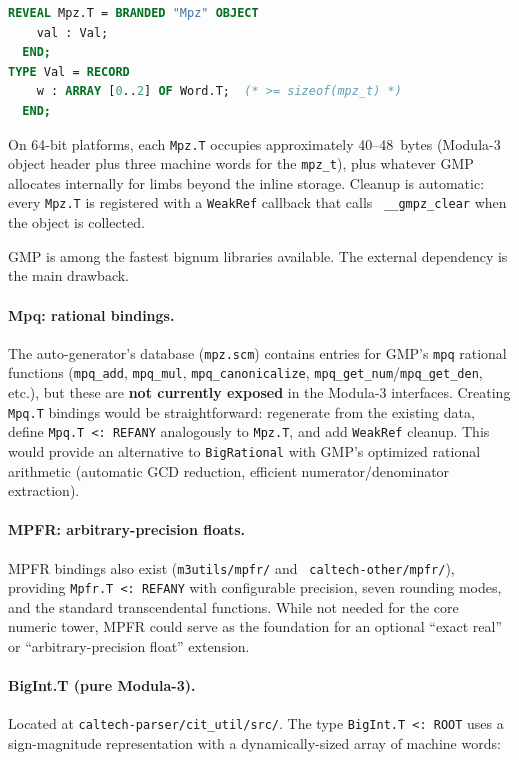 \documentclass[12pt]{report}
\begin{document}
\begin{lstlisting}[language=Modula3]
REVEAL Mpz.T = BRANDED "Mpz" OBJECT
    val : Val;
  END;
TYPE Val = RECORD
    w : ARRAY [0..2] OF Word.T;  (* >= sizeof(mpz_t) *)
  END;
\end{lstlisting}

\noindent On 64-bit platforms, each {\tt Mpz.T} occupies approximately
40--48~bytes (Modula-3 object header plus three machine words for the
{\tt mpz\_t}), plus whatever GMP allocates internally for limbs beyond
the inline storage.  Cleanup is automatic: every {\tt Mpz.T} is
registered with a {\tt WeakRef} callback that calls {\tt
\_\_gmpz\_clear} when the object is collected.

GMP is among the fastest bignum libraries available.
The external dependency is the main drawback.

\paragraph{Mpq: rational bindings.}
The auto-generator's database ({\tt mpz.scm}) contains entries for
GMP's {\tt mpq} rational functions ({\tt mpq\_add}, {\tt mpq\_mul},
{\tt mpq\_canonicalize}, {\tt mpq\_get\_num}/{\tt mpq\_get\_den},
etc.), but these are \textbf{not currently exposed} in the Modula-3
interfaces.  Creating {\tt Mpq.T} bindings would be straightforward:
regenerate from the existing data, define {\tt Mpq.T <: REFANY}
analogously to {\tt Mpz.T}, and add {\tt WeakRef} cleanup.  This
would provide an alternative to {\tt BigRational} with GMP's
optimized rational arithmetic (automatic GCD reduction, efficient
numerator/denominator extraction).

\paragraph{MPFR: arbitrary-precision floats.}
MPFR bindings also exist ({\tt m3utils/mpfr/} and {\tt
caltech-other/mpfr/}), providing {\tt Mpfr.T <: REFANY} with
configurable precision, seven rounding modes, and the standard
transcendental functions.  While not needed for the core numeric
tower, MPFR could serve as the foundation for an optional
``exact real'' or ``arbitrary-precision float'' extension.

\paragraph{BigInt.T (pure Modula-3).}
Located at {\tt caltech-parser/\allowbreak cit\_util/\allowbreak src/}.  The
type {\tt BigInt.T <: ROOT} uses a sign-magnitude representation with
a dynamically-sized array of machine words:
\end{document}

